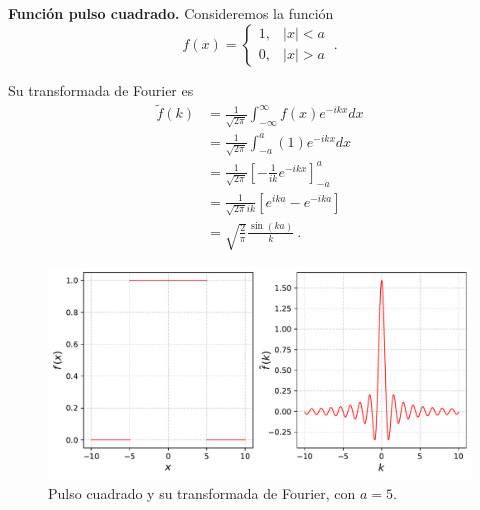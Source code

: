 
\begin{ejemplo} \label{PulsoCuadrado}
    \textbf{Función pulso cuadrado.} Consideremos la función 
    \begin{equation*}
        f(x) = \left\{ \begin{array}{cl}
            1,& |x|<a  \\
            0,& |x|> a
        \end{array} \right. \ .
    \end{equation*}

    Su transformada de Fourier es 
    \begin{align}
        \tilde{f}(k) & = \frac{1}{\sqrt{2\pi}} \int_{-\infty}^{\infty} f(x) e^{-ikx} dx \nonumber \\
        & = \frac{1}{\sqrt{2\pi}}\int_{-a}^a (1)  e^{-ikx} dx \nonumber \\
        & = \frac{1}{\sqrt{2\pi}} \left[ - \frac{1}{ik} e^{-ikx} \right]_{-a}^a \nonumber\\
        & = \frac{1}{\sqrt{2\pi} i k} [e^{ika} - e^{-ika}] \nonumber\\
        & = \sqrt{\frac{2}{\pi}} \frac{\sin(ka)}{k} \ . \label{TransPulsoCuadrado}
    \end{align}

    \begin{figure}[H]
        \centering
        \includegraphics[scale = 0.55]{Figuras/EjemploTransformada1.pdf}
        \caption{Pulso cuadrado y su transformada de Fourier, con $a = 5$.}
        \label{Espectro2}
    \end{figure}

\end{ejemplo}

